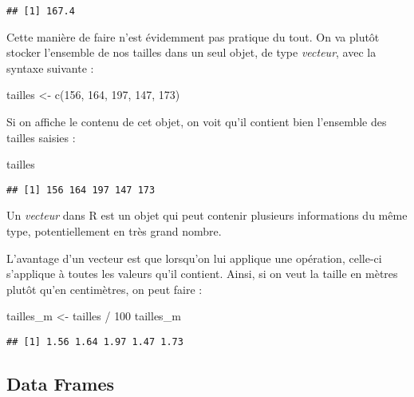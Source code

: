 \documentclass[
]{article}
\newenvironment{Shaded}{\begin{snugshade}}{\end{snugshade}}
\newcommand{\DecValTok}[1]{\textcolor[rgb]{0.00,0.00,0.81}{#1}}
\newcommand{\FunctionTok}[1]{\textcolor[rgb]{0.00,0.00,0.00}{#1}}
\newcommand{\NormalTok}[1]{#1}
\newcommand{\OtherTok}[1]{\textcolor[rgb]{0.56,0.35,0.01}{#1}}
\newcommand{\SpecialCharTok}[1]{\textcolor[rgb]{0.00,0.00,0.00}{#1}}
\begin{document}
\begin{verbatim}
## [1] 167.4
\end{verbatim}

Cette manière de faire n'est évidemment pas pratique du tout. On va
plutôt stocker l'ensemble de nos tailles dans un seul objet, de type
\emph{vecteur}, avec la syntaxe suivante :

\begin{Shaded}
\begin{Highlighting}[]
\NormalTok{tailles }\OtherTok{\textless{}{-}} \FunctionTok{c}\NormalTok{(}\DecValTok{156}\NormalTok{, }\DecValTok{164}\NormalTok{, }\DecValTok{197}\NormalTok{, }\DecValTok{147}\NormalTok{, }\DecValTok{173}\NormalTok{)}
\end{Highlighting}
\end{Shaded}

Si on affiche le contenu de cet objet, on voit qu'il contient bien
l'ensemble des tailles saisies :

\begin{Shaded}
\begin{Highlighting}[]
\NormalTok{tailles}
\end{Highlighting}
\end{Shaded}

\begin{verbatim}
## [1] 156 164 197 147 173
\end{verbatim}

Un \emph{vecteur} dans R est un objet qui peut contenir plusieurs
informations du même type, potentiellement en très grand nombre.

L'avantage d'un vecteur est que lorsqu'on lui applique une opération,
celle-ci s'applique à toutes les valeurs qu'il contient. Ainsi, si on
veut la taille en mètres plutôt qu'en centimètres, on peut faire :

\begin{Shaded}
\begin{Highlighting}[]
\NormalTok{tailles\_m }\OtherTok{\textless{}{-}}\NormalTok{ tailles }\SpecialCharTok{/} \DecValTok{100}
\NormalTok{tailles\_m}
\end{Highlighting}
\end{Shaded}

\begin{verbatim}
## [1] 1.56 1.64 1.97 1.47 1.73
\end{verbatim}

\hypertarget{data-frames}{%
\subsection{Data Frames}\label{data-frames}}
\end{document}
